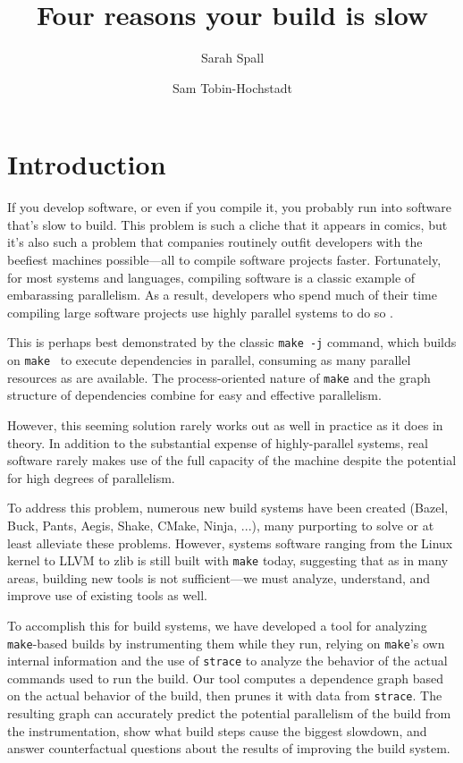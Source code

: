 \documentclass[sigconf,10pt,authorversion]{acmart}\settopmatter{printfolios=true,printccs=false,printacmref=false}
\title{Four reasons your build is slow}
\author{Sarah Spall}
\affiliation{Indiana University}
\author{Sam Tobin-Hochstadt}
\affiliation{Indiana University}
\begin{document}
\maketitle

\section{Introduction}

If you develop software, or even if you compile it, you probably run
into software that's slow to build. This problem is such a cliche that
it appears in comics, but it's also such a problem that companies
routinely outfit developers with the beefiest machines possible---all
to compile software projects faster. Fortunately, for most systems and
languages, compiling software is a classic example of embarassing
parallelism. As a result, developers who spend much of their time
compiling large software projects use highly parallel systems to do so
\cite{regehr-tweet}.

This is perhaps best demonstrated by the classic \verb|make -j|
command, which builds on \verb|make|~\cite{make} to execute
dependencies in parallel, consuming as many parallel resources as are
available. The process-oriented nature of \verb|make| and the graph
structure of dependencies combine for easy and effective parallelism.

However, this seeming solution rarely works out as well in practice as
it does in theory. In addition to the substantial expense of
highly-parallel systems, real software rarely makes use of the full
capacity of the machine despite the potential for high
degrees of parallelism.

To address this problem, numerous new build systems have been created
(Bazel, Buck, Pants, Aegis, Shake, CMake, Ninja, ...), many purporting
to solve or at least alleviate these problems. However, systems
software ranging from the Linux kernel to LLVM to zlib is still built
with \verb|make| today, suggesting that as in many areas, building new
tools is not sufficient---we must analyze, understand, and improve use
of existing tools as well.

To accomplish this for build systems, we have developed a tool for
analyzing \verb|make|-based builds by instrumenting them while they
run, relying on \verb|make|'s own internal information and the use of
\verb|strace| to analyze the behavior of the actual commands used to
run the build. Our tool computes a dependence graph based on the
actual behavior of the build, then prunes it with data from
\verb|strace|. The resulting graph can accurately predict the
potential parallelism of the build from the instrumentation, show what
build steps cause the biggest slowdown, and answer counterfactual
questions about the results of improving the build system.
\end{document}
